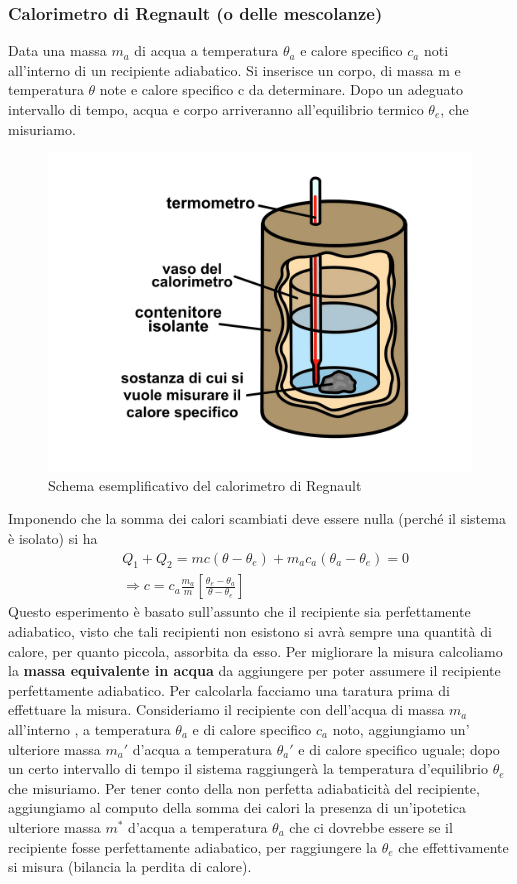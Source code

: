\documentclass[
10pt, %
a4paper, %
oneside, %
headinclude,footinclude, %
BCOR5mm, %
]{scrartcl}
\begin{document}
\subsubsection*{Calorimetro di Regnault (o delle mescolanze)}
Data una massa $m_a$ di acqua a temperatura $\theta_a$ e calore specifico $c_a$ noti all'interno di un recipiente adiabatico. Si inserisce un corpo, di massa m e temperatura $\theta$ note e calore specifico c da determinare. Dopo un adeguato intervallo di tempo, acqua e corpo arriveranno all'equilibrio termico $\theta_e$, che misuriamo.
\begin{figure}[h!]
	\centering
	\includegraphics[width=0.5\linewidth]{../images/calorimetro_regnault}
	\caption{Schema esemplificativo del calorimetro di Regnault}
	\label{fig:calorimetroregnault}
\end{figure}
\FloatBarrier
Imponendo che la somma dei calori scambiati deve essere nulla (perché il sistema è isolato) si ha
\begin{align*} 
	&Q_1 + Q_2 = m c \left(\theta - \theta_e\right) + m_a c_a \left(\theta_a - \theta_e \right) = 0 \\
	&\Rightarrow c = c_a \frac{m_a}{m}\left[\frac{\theta_e - \theta_a}{\theta - \theta_e}\right]
\end{align*} 
Questo esperimento è basato sull'assunto che il recipiente sia perfettamente adiabatico, visto che tali recipienti non esistono si avrà sempre una quantità di calore, per quanto piccola, assorbita da esso. Per migliorare la misura calcoliamo la \textbf{massa equivalente in acqua} da aggiungere per poter assumere il recipiente perfettamente adiabatico. Per calcolarla facciamo una taratura prima di effettuare la misura. Consideriamo il recipiente con dell'acqua di massa \(m_a\) all'interno , a temperatura \(\theta_a\) e di calore specifico \(c_a\) noto, aggiungiamo un' ulteriore massa \(m_a'\) d'acqua a temperatura \(\theta_a'\) e di calore specifico uguale; dopo un certo intervallo di tempo il sistema raggiungerà la temperatura d'equilibrio \(\theta_e\) che misuriamo. Per tener conto della non perfetta adiabaticità del recipiente, aggiungiamo al computo della somma dei calori la presenza di un'ipotetica ulteriore massa \(m^*\) d'acqua a temperatura \(\theta_a\) che ci dovrebbe essere se il recipiente fosse perfettamente adiabatico, per raggiungere la $\theta_e$ che effettivamente si misura (bilancia la perdita di calore). 
\end{document}
